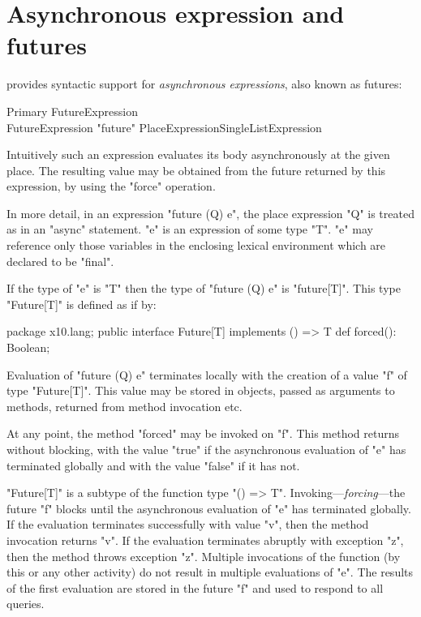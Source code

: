 
\section{Asynchronous expression and futures}\label{XtenFutures}

\Xten{} provides syntactic support for {\em asynchronous expressions}, also
known as futures:

\begin{grammar}
Primary \: FutureExpression \\
FutureExpression \:
  \xcd"future" PlaceExpressionSingleList\opt Expression
\end{grammar} 

Intuitively such an expression evaluates its body asynchronously at
the given place. The resulting value may be obtained from the future
returned by this expression, by using the \xcd"force" operation.

In more detail, in an expression \xcd"future (Q) e", the place
expression \xcd"Q" is treated as in an \xcd"async" statement. \xcd"e"
is an expression of some type \xcd"T". \xcd"e" may reference only
those variables in the enclosing lexical environment which are
declared to be \xcd"final".

If the type of \xcd"e" is \xcd"T" then the type of
\xcd"future (Q) e" is \xcd"future[T]".  This 
type \xcd"Future[T]" is defined as if by:
\begin{xten}
package x10.lang;
public interface Future[T] implements () => T {
  def forced(): Boolean;
}
\end{xten}

Evaluation of \xcd"future (Q) e" terminates locally with the creation
of a value \xcd"f" of type \xcd"Future[T]".  This value may be
stored in objects, passed as arguments to methods, returned from
method invocation etc. 

At any point, the method \xcd"forced" may be invoked on \xcd"f". This
method returns without blocking, with the value \xcd"true" if the
asynchronous evaluation of \xcd"e" has terminated globally and with
the value \xcd"false" if it has not.

\xcd"Future[T]" is a subtype of the function type \xcd"() => T".
Invoking---\emph{forcing}---the future \xcd"f" blocks until the
asynchronous evaluation of \xcd"e" has terminated globally. If the
evaluation terminates successfully with value \xcd"v", then the method
invocation returns \xcd"v". If the evaluation terminates abruptly with
exception \xcd"z", then the method throws exception \xcd"z". Multiple
invocations of the function (by this or any other activity) do not
result in multiple evaluations of \xcd"e". The results of the first
evaluation are stored in the future \xcd"f" and used to respond to all
queries.

